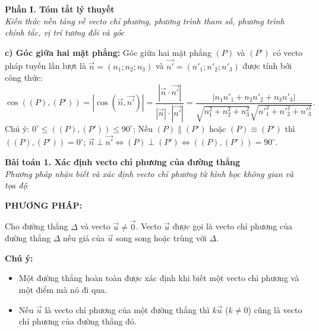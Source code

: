 \documentclass[12pt,a4paper]{article}
\newenvironment{lesson}[2]{
	\vspace{1em}\noindent\textbf{\Large #1}\\
	\textit{#2}\vspace{0.5em}
}{}
\begin{document}
\begin{lesson}{Phần I. Tóm tắt lý thuyết}{Kiến thức nền tảng về vecto chỉ phương, phương trình tham số, phương trình chính tắc, vị trí tương đối và góc}
\textbf{c) Góc giữa hai mặt phẳng:}
Góc giữa hai mặt phẳng $(P)$ và $(P')$ có vecto pháp tuyến lần lượt là $\vec{n} = (n_1; n_2; n_3)$ và $\vec{n'} = (n'_1; n'_2; n'_3)$ được tính bởi công thức:
$$\cos((P), (P')) = |\cos(\vec{n}, \vec{n'})| = \frac{|\vec{n} \cdot \vec{n'}|}{|\vec{n}| \cdot |\vec{n'}|} = \frac{|n_1n'_1 + n_2n'_2 + n_3n'_3|}{\sqrt{n_1^2 + n_2^2 + n_3^2}\sqrt{n'^2_1 + n'^2_2 + n'^2_3}}.$$
Chú ý: $0^\circ \le ((P), (P')) \le 90^\circ$; Nếu $(P) \parallel (P')$ hoặc $(P) \equiv (P')$ thì $((P), (P')) = 0^\circ$; $\vec{n} \perp \vec{n'} \Leftrightarrow (P) \perp (P') \Leftrightarrow ((P), (P')) = 90^\circ$.

\end{lesson}



\begin{lesson}{Bài toán 1. Xác định vecto chỉ phương của đường thẳng}{Phương pháp nhận biết và xác định vecto chỉ phương từ hình học không gian và tọa độ}

\textbf{PHƯƠNG PHÁP:}

Cho đường thẳng $\Delta$ và vecto $\vec{u} \ne \vec{0}$. Vecto $\vec{u}$ được gọi là vecto chỉ phương của đường thẳng $\Delta$ nếu giá của $\vec{u}$ song song hoặc trùng với $\Delta$.

\textbf{Chú ý:}
\begin{itemize}
    \item Một đường thẳng hoàn toàn được xác định khi biết một vecto chỉ phương và một điểm mà nó đi qua.
    \item Nếu $\vec{u}$ là vecto chỉ phương của một đường thẳng thì $k\vec{u}$ ($k \ne 0$) cũng là vecto chỉ phương của đường thẳng đó.
\end{itemize}

\end{lesson}
\end{document}
